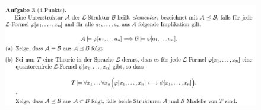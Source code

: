 \documentclass[a4paper]{scrartcl}
\begin{document}
\section*{}%
\label{sec:aufgabe_3}

    \begin{figure}[H]
        \centering
        \includegraphics[scale=0.3]{./A-3.png}
        \label{fig:}
    \end{figure}
\end{document}
